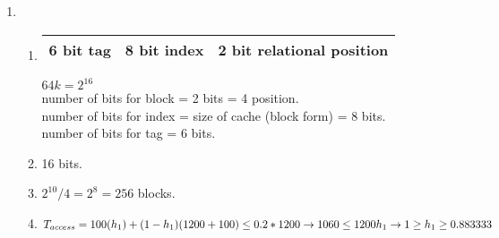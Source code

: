 \documentclass[12pt]{article}
\begin{document}
\begin{enumerate}
    \item \mbox{}

        \begin{enumerate}
            \item \mbox{}
                \begin{table}[h!]
                    \centering
                    \begin{tabular}{|c|c|c|}
                        \hline
                        6 bit tag & 8 bit index & 2 bit relational position\\ \hline
                    \end{tabular}
                \end{table}
                $64k=2^{16}$\\
                number of bits for block = 2 bits = 4 position.\\
                number of bits for index = size of cache (block form) = 8 bits.\\
                number of bits for tag = 6 bits.
            \item
                16 bits.
            \item
                $2^{10}/4=2^8=256$ blocks.
            \item
                $T_{access}=100(h_1)+(1-h_1)(1200+100) \leq 0.2*1200 \to 1060 \leq 1200h_1\\
                \to 1 \geq h_1 \geq 0.883333$

        \end{enumerate}


\end{enumerate}
\end{document}
